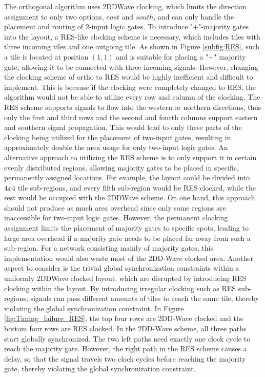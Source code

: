 The orthogonal algorithm uses 2DDWave clocking, which limits the direction assignment to only two options, $east$ and $south$, and can only handle the placement and routing of 2-input logic gates. To introduce "+"-majority gates into the layout, a RES-like clocking scheme is necessary, which includes tiles with three incoming tiles and one outgoing tile. As shown in Figure \ref{subfig:RES}, such a tile is located at position $(1, 1)$ and is suitable for placing a "+" majority gate, allowing it to be connected with three incoming signals. However, changing the clocking scheme of ortho to RES would be highly inefficient and difficult to implement. This is because if the clocking were completely changed to RES, the algorithm would not be able to utilize every row and column of the clocking. The RES scheme supports signals to flow into the western or northern directions, thus only the first and third rows and the second and fourth columns support eastern and southern signal propagation. This would lead to only these parts of the clocking being utilized for the placement of two-input gates, resulting in approximately double the area usage for only two-input logic gates.
An alternative approach to utilizing the RES scheme is to only support it in certain evenly distributed regions, allowing majority gates to be placed in specific, permanently assigned locations. For example, the layout could be divided into $4x4$ tile sub-regions, and every fifth sub-region would be RES clocked, while the rest would be occupied with the 2DDWave scheme. On one hand, this approach should not produce as much area overhead since only some regions are inaccessible for two-input logic gates. However, the permanent clocking assignment limits the placement of majority gates to specific spots, leading to large area overhead if a majority gate needs to be placed far away from such a sub-region. For a network consisting mainly of majority gates, this implementation would also waste most of the 2DD-Wave clocked area. Another aspect to consider is the trivial global synchronization constraints within a uniformly 2DDWave clocked layout, which are disrupted by introducing RES clocking within the layout. By introducing irregular clocking such as RES sub-regions, signals can pass different amounts of tiles to reach the same tile, thereby violating the global synchronization constraint. In Figure \ref{fig:Timing_failure_RES}, the top four rows are 2DD-Wave clocked and the bottom four rows are RES clocked. In the 2DD-Wave scheme, all three paths start globally synchronized. The two left paths need exactly one clock cycle to reach the majority gate. However, the right path in the RES scheme causes a delay, so that the signal travels two clock cycles before reaching the majority gate, thereby violating the global synchronization constraint.


